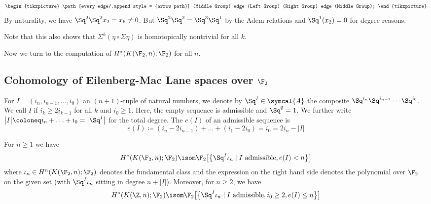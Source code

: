 \begin{example}
\begin{equation*}
\begin{tikzpicture}
			\path[every edge/.append style = {arrow path}]
				(Middle Group) edge (Left Group)
				(Right Group) edge (Middle Group);
		\end{tikzpicture}
	\end{equation*}
	By naturality, we have $\Sq^2 \Sq^2 x_2 = x_6 \neq 0$.
	But $\Sq^2 \Sq^2 = \Sq^3 \Sq^1$ by the Adem relations and $\Sq^1(x_2) = 0$ for degree reasons.

	Note that this also shows that $\Sigma^k(\eta \circ \Sigma \eta)$ is homotopically nontrivial for all $k$.
\end{example}

Now we turn to the computation of $H^*(K(\F_2, n); \F_2)$ for all $n$.
\subsection{Cohomology of Eilenberg-Mac Lane spaces over \texorpdfstring{$\F_2$}{F2}}
\begin{definition}
	For $I = (i_n, i_{n - 1}, \ldots, i_0)$ an $(n + 1)$-tuple of natural numbers, we denote by $\Sq^I \in \symcal{A}$ the composite $\Sq^{i_n} \Sq^{i_{n - 1}} \cdots \Sq^{i_0}$.
	We call $I$  if $i_k \geq 2 i_{k - 1}$ for all $k$ and $i_0 \geq 1$.
	Here, the empty sequence is admissible and $\Sq^{\emptyset} = 1$.
	We further write $\big|I\big| \coloneq i_n + \ldots + i_0 = \big|\Sq^I\big|$ for the total degree.
	The  $e(I)$ of an admissible sequence is 
	\begin{equation*}
		e(I) \coloneq (i_n - 2 i_{n - 1}) + \ldots + (i_1 - 2 i_0) = i_0 = 2 i_n - \big|I\big|
	\end{equation*}
\end{definition}
\begin{theorem}\label{thm:cartanserre}
	For $n \geq 1$ we have 
	\begin{equation*}
		H^*(K(\F_2, n); \F_2) \isom \F_2\big[\big\{\Sq^I \iota_n \mid I \text{ admissible}, e(I) < n\big\}\big]
	\end{equation*}
	where $\iota_n \in H^n(K(\F_2, n); \F_2)$ denotes the fundamental class and the expression on the right hand side denotes the polynomial over $\F_2$ on the given set (with $\Sq^I \iota_n$ sitting in degree $n + \big|I\big|$).
	Moreover, for $n \geq 2$, we have 
	\begin{equation*}
		H^*(K(\Z, n); \F_2) \isom \F_2\big[\big\{\Sq^I \iota_n \mid I \text{ admissible}, i_0 \geq 2, e(I) \leq n\big\}\big]
	\end{equation*}
\end{theorem}
